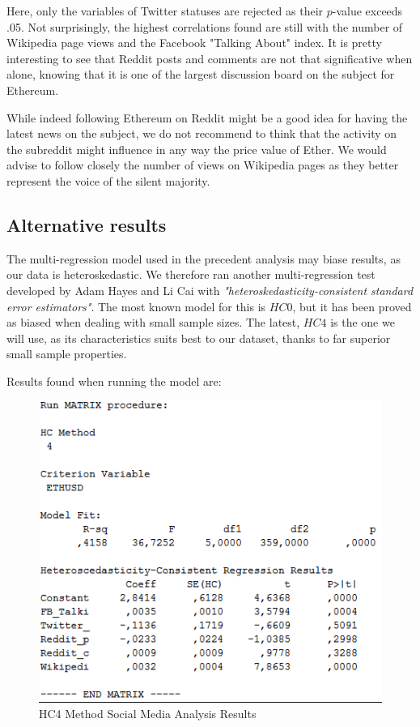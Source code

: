 \documentclass[11pt]{report}
\begin{document}
Here, only the variables of Twitter statuses are rejected as their $p$-value exceeds .05. Not surprisingly, the highest correlations found are still with the number of Wikipedia page views and the Facebook "Talking About" index. It is pretty interesting to see that Reddit posts and comments are not that significative when alone, knowing that it is one of the largest discussion board on the subject for Ethereum. \newline

While indeed following Ethereum on Reddit might be a good idea for having the latest news on the subject, we do not recommend to think that the activity on the subreddit might influence in any way the price value of Ether. We would advise to follow closely the number of views on Wikipedia pages as they better represent the voice of the silent majority.

\clearpage
\subsection*{Alternative results}
The multi-regression model used in the precedent analysis may biase results, as our data is heteroskedastic. We therefore ran another multi-regression test developed by Adam Hayes and Li Cai \cite{REGRESSION} with \textit{"heteroskedasticity-consistent standard 
error estimators"}. The most known model for this is $HC0$, but it has been proved as biased when dealing with small sample sizes. The latest, $HC4$ is the one we will use, as its characteristics suits best to our dataset, thanks to far superior small sample 
properties. \newline

Results found when running the model are: \medbreak

 \begin{figure}[!h]
\centering
\includegraphics[scale=1.3]{Chap5/HC4}\medbreak
\centering
\caption{HC4 Method Social Media Analysis Results}
\label{HC4}
\end{figure}
\clearpage
\end{document}
